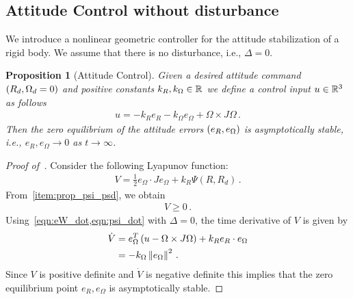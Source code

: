 \documentclass[letterpaper, 10 pt, conference]{ieeeconf}  %
\newtheorem{prop}{Proposition}
\begin{document}
\subsection{Attitude Control without disturbance}
We introduce a nonlinear geometric controller for the attitude stabilization of a rigid body.
We assume that there is no disturbance, i.e., \( \Delta = 0 \).
\begin{prop}[Attitude Control]\label{prop:att_control}
	Given a desired attitude command \( \left( R_d, \Omega_d = 0 \right) \) and positive constants \( k_R, k_\Omega \in \mathbb{R} \) we define a control input \( u \in \mathbb{R}^3 \) as follows
	\begin{gather}
		u = -k_R e_R - k_\Omega e_\Omega + \Omega \times J \Omega \, . \label{eqn:nodist_control}
	\end{gather}
	Then the zero equilibrium of the attitude errors \( \left( e_R, e_\Omega \right) \) is asymptotically stable, i.e., \(e_R, e_\Omega \to 0 \) as \( t \to \infty \).
\end{prop}

\begin{proof}[Proof of~]\label{proof:att_control}
	Consider the following Lyapunov function:
	\begin{gather}
		V = \frac{1}{2} e_\Omega \cdot J e_\Omega + k_R \Psi(R,R_d) \, . \label{eqn:v_nodist}
	\end{gather}
	From~\cref{item:prop_psi_psd}, we obtain
	\begin{gather*}
		V \geq 0 \, .
	\end{gather*}
	Using~\cref{eqn:eW_dot,eqn:psi_dot} with \( \Delta = 0 \), the time derivative of \( V \) is given by
	\begin{align}
		\dot{V} &= e_\Omega^T \left(  u - \Omega \times J \Omega  \right) + k_R e_R \cdot e_\Omega \nonumber \\
		&= -k_\Omega \left\| e_\Omega \right\|^2 \, . \label{eqn:vdot_nodist}
	\end{align}
	Since \( V \) is positive definite and \( \dot{V} \) is negative definite this implies that the zero equilibrium point \( e_R, e_\Omega \) is asymptotically stable.
\end{proof}
\end{document}
